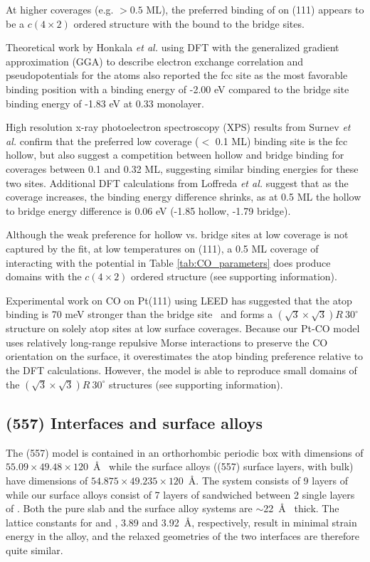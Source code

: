 \documentclass[journal = jpccck, manuscript = article]{achemso}
\begin{document}
At higher  coverages (e.g. $> 0.5$ ML), the preferred binding
of  on (111) appears to be a $c(4\times2)$ ordered
structure with the  bound to the bridge
sites.\cite{Bradshaw:1978uf} 

Theoretical work by Honkala \textit{et al.}\cite{Honkala:2001sf} using
DFT with the generalized gradient approximation (GGA) to describe
electron exchange correlation and pseudopotentials for the 
atoms also reported the fcc site as the most favorable binding
position with a binding energy of -2.00 eV compared to the bridge site
binding energy of -1.83 eV at 0.33 monolayer.

High resolution x-ray photoelectron spectroscopy (XPS) results from
Surnev \textit{et al.}\cite{Surnev:2000uk} confirm that the preferred
low coverage ($< $ 0.1 ML) binding site is the fcc hollow, but also
suggest a competition between hollow and bridge binding for coverages
between 0.1 and 0.32 ML, suggesting similar binding energies for these
two sites. Additional DFT calculations from Loffreda \textit{et
al.}\cite{Loffreda:1999vl} suggest that as the coverage increases, the
binding energy difference shrinks, as at 0.5 ML the hollow to bridge
energy difference is 0.06 eV (-1.85 hollow, -1.79 bridge).

Although the weak preference for hollow vs. bridge sites at low
coverage is not captured by the  fit, at low
temperatures on (111), a 0.5 ML coverage of  interacting
with the potential in Table \ref{tab:CO_parameters} does produce
domains with the $c(4\times2)$ ordered structure (see supporting
information).

Experimental work on CO on Pt(111) using LEED has suggested that the
atop binding is 70 meV stronger than the bridge
site~\cite{Schweizer:1989fk} and forms a
$(\sqrt{3} \times \sqrt{3}) R~30^{\circ}$ structure on solely atop
sites at low surface coverages.\cite{Kelemen:1979} Because our Pt-CO
model uses relatively long-range repulsive Morse interactions to
preserve the CO orientation on the surface, it overestimates the atop
binding preference relative to the DFT calculations.  However, the
model is able to reproduce small domains of the
$(\sqrt{3} \times \sqrt{3}) R~30^{\circ}$ structures (see supporting
information).

\subsection{(557) Interfaces and surface alloys}
The (557) model is contained in an orthorhombic periodic box
with dimensions of $55.09 \times 49.48 \times 120$~\AA~ while the
surface alloys ((557) surface layers, with  bulk) have
dimensions of $54.875 \times 49.235 \times 120$~\AA.  The 
system consists of 9 layers of  while our surface alloys
consist of 7 layers of  sandwiched between 2 single layers of
.  Both the pure  slab and the surface alloy systems are
$\sim$22~\AA~ thick. The lattice constants for  and ,
3.89 and 3.92~\AA, respectively, result in minimal strain energy in
the alloy, and the relaxed geometries of the two interfaces are
therefore quite similar.
\end{document}
